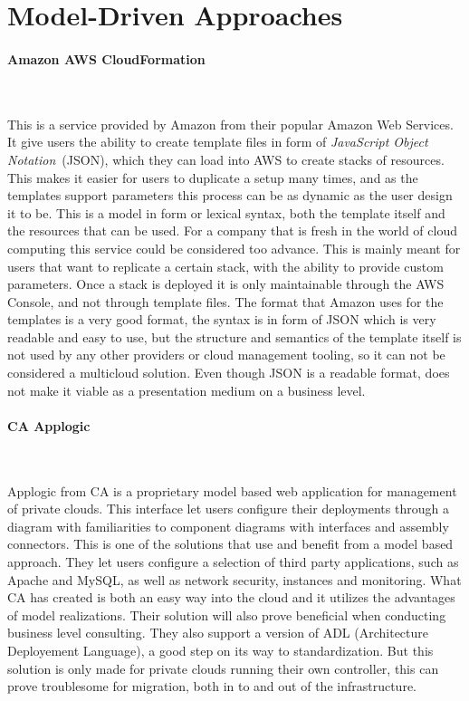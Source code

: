 \section{Model-Driven Approaches}

\paragraph{Amazon AWS CloudFormation}~\cite{aws}

This is a service provided by Amazon from their popular Amazon Web Services. 
It give users the ability to create template files in form of 
\emph{JavaScript Object Notation}~(JSON), which they can load into AWS to create stacks of resources. 
This makes it easier for users to duplicate a setup many times, and as the templates support parameters this process 
can be as dynamic as the user design it to be. This is a model in form or lexical syntax, both the template itself and the resources that can be used.
For a company that is fresh in the world of cloud computing this service could be considered too advance. 
This is mainly meant for users that want to replicate a certain stack, with the ability to provide custom parameters. 
Once a stack is deployed it is only maintainable through the AWS Console, and not through template files. 
The format that Amazon uses for the templates is a very good format, the syntax is in form of JSON which is very readable and easy to use, 
but the structure and semantics of the template itself is not used by any other providers or cloud management tooling, 
so it can not be considered a multicloud solution. Even though JSON is a readable format, does not make it viable as a presentation medium on a business level.

\paragraph{CA Applogic}~\cite{applogic}

Applogic from CA is a proprietary model based web application for management of private clouds. 
This interface let users configure their deployments through a diagram with familiarities to component diagrams with interfaces and assembly connectors. 
This is one of the solutions that use and benefit from a model based approach. They let users configure a selection of third party applications, 
such as Apache and MySQL, as well as network security, instances and monitoring. 
What CA has created is both an easy way into the cloud and it utilizes the advantages of model realizations. 
Their solution will also prove beneficial when conducting business level consulting. 
They also support a version of ADL (Architecture Deployement Language), a good step on its way to standardization. 
But this solution is only made for private clouds running their own controller, this can prove troublesome for migration, both in to and out of the infrastructure.

